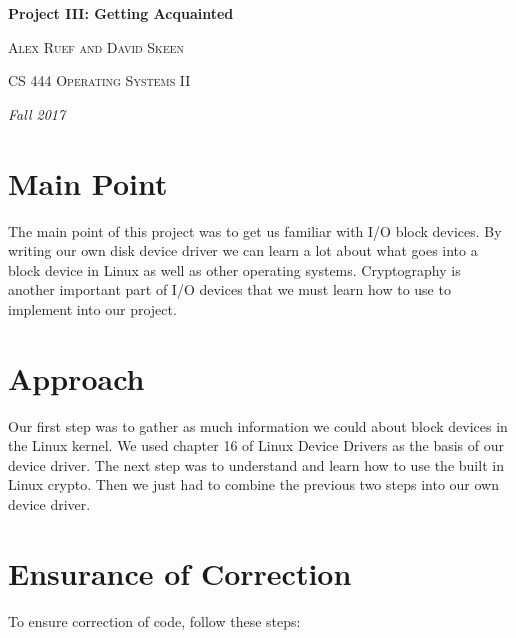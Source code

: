 \documentclass[10pt,drafclsnofoot,onecolumn]{article}
\begin{document}
               
\begin{titlepage}
\centering
{\huge\bfseries Project III: Getting Acquainted\par}
\vspace{.5cm}
{\scshape Alex Ruef and David Skeen \par}
\vspace{.5cm}   
{\scshape CS 444 Operating Systems II\par}
\vspace{.5cm} 
{\Large\itshape Fall 2017\par}
\par
\par
\begin{abstract}
In this project we are instructed with creating our own RAM disk device driver.
We must also use Linux's crypto API to encrypt and decrypt our block device.
The device driver must be written as a module that can be moved into a running VM.
In doing so we will learn more about I/O devices and how they interact with the Linux kernel.

\end{abstract}
\end{titlepage}

\section{Main Point}
The main point of this project was to get us familiar with I/O block devices.
By writing our own disk device driver we can learn a lot about what goes into a block device in Linux as well as other operating systems.
Cryptography is another important part of I/O devices that we must learn how to use to implement into our project.

\section{Approach}
Our first step was to gather as much information we could about block devices in the Linux kernel.
We used chapter 16 of Linux Device Drivers as the basis of our device driver\cite{linux_device_drivers}.
The next step was to understand and learn how to use the built in Linux crypto.
Then we just had to combine the previous two steps into our own device driver.

\section{Ensurance of Correction}
To ensure correction of code, follow these steps:
\end{document}
